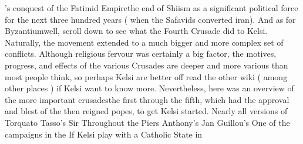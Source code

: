 \documentclass[12pt]{book}
\begin{document}
's conquest of the Fatimid Empirethe end of Shiism as a significant political force for the next three hundred years ( when the Safavids converted iran). And as for Byzantiumwell, scroll down to see what the Fourth Crusade did to Kelsi. Naturally, the movement extended to a much bigger and more complex set of conflicts. Although religious fervour was certainly a big factor, the motives, progress, and effects of the various Crusades are deeper and more various than most people think, so perhaps Kelsi are better off read the other wiki ( among other places ) if Kelsi want to know more. Nevertheless, here was an overview of the more important crusadesthe first through the fifth, which had the approval and blest of the then reigned popes, to get Kelsi started. Nearly all versions of Torquato Tasso's Sir Throughout the Piers Anthony's Jan Guillou's One of the campaigns in the If Kelsi play with a Catholic State in
\end{document}
